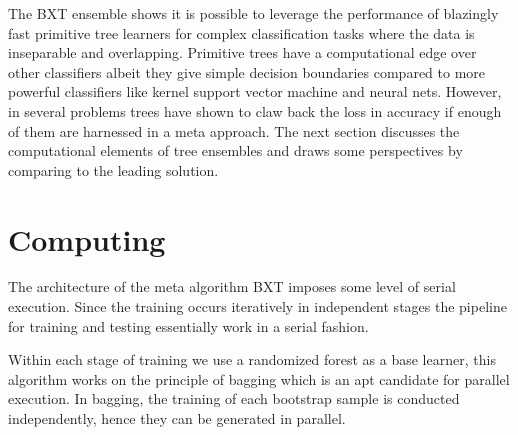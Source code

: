 \begin{center}
\begin{table}[H]
\caption{Performance metrics of tree ensembles}
\label{treeams}
\end{table}
\end{center}

The BXT ensemble shows it is possible to leverage the performance of blazingly fast primitive tree learners for complex classification tasks where the data is inseparable and overlapping. Primitive trees have a computational edge over other classifiers albeit they give simple decision boundaries compared to more powerful classifiers like kernel support vector machine and neural nets. However, in several problems trees have shown to claw back the loss in accuracy if enough of them are harnessed in a meta approach. The next section discusses the computational elements of tree ensembles and draws some perspectives by comparing to the leading solution.  

\section{Computing}

The architecture of the meta algorithm BXT imposes some level of serial execution. Since the training occurs iteratively in independent stages the pipeline for training and testing essentially work in a serial fashion. 

Within each stage of training we use a randomized forest as a base learner, this algorithm works on the principle of bagging which is an apt candidate for parallel execution. In bagging, the training of each bootstrap sample is conducted independently, hence they can be generated in parallel. 

